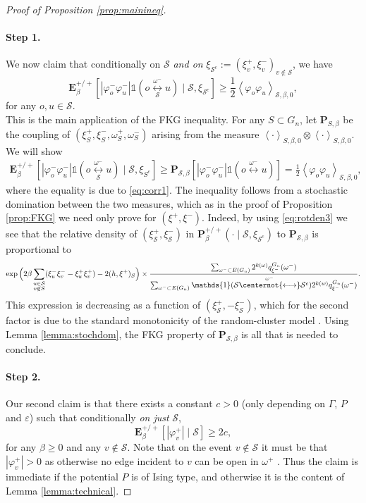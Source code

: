 \documentclass{article}
\numberwithin{equation}{section}
\theoremstyle{definition}
\theoremstyle{definition}
\theoremstyle{remark}
\newcommand{\E}{\mathbb{E}}
\newcommand\vp{\varphi}
\newcommand{\w}{\omega}
\newcommand{\vpm}{\vp^-}
\renewcommand{\P}{\mathrm{\mathbf{P}}}
\newcommand{\Q}{\mathrm{\mathbf{P}}}
\renewcommand{\E}{\mathrm{\mathbf{E}}}
\renewcommand{\L}{\xi}
\renewcommand{\i}{\mathds{1}}
\renewcommand{\S}{\mathcal{S}}
\newcommand{\eps}{\varepsilon}
\newcommand{\G}{\Gamma}
\begin{document}
\begin{proof}[Proof of Proposition \ref{prop:mainineq}]
	\paragraph{Step 1. }We now claim that conditionally on $\S$ \emph{and on} $\L_{\S^c} := ( \L^+_v, \L^-_v)_{v \not\in \S}$, we have
	\[
		\E_\beta^{+ / +}\left[|\vpm_o\vpm_u| \i(o \underset{\S}{\overset{\w^-}{\longleftrightarrow}} u) \mid \S, \L_{\S^c} \right] \geq \frac{1}{2}\left< \vp_o \vp_u \right>_{\S,\beta,0},
	\] 
	for any $o,u \in \S$.
	\\[1em]
	\noindent This is the main application of the FKG inequality. For any $S \subset G_n$, let $\Q_{S,\beta}$ be the coupling of $(\L^+_S,\L^-_S,\w^+_S,\w^-_S)$ arising from the measure $\left< \cdot \right>_{S,\beta,0} \otimes \left< \cdot \right>_{S,\beta,0}$. We will show 
	\begin{align}\label{eq:keystep}
		\E_{\beta}^{+ / +}\left[ |\vpm_o \vpm_u| \i(o \underset{\S}{\overset{\w^-}{\longleftrightarrow}} u)\mid \S , \L_{S^c}  \right] \geq \Q_{\S,\beta}\left[ |\vpm_o \vpm_u| \i(o \overset{\w^-}{\longleftrightarrow} u) \right]  = \frac{1}{2} \left< \vp_o \vp_u \right>_{\S,\beta,0},
	\end{align} 
	where the equality is due to \eqref{eq:corr1}. The inequality follows from a stochastic domination between the two measures, which as in the proof of Proposition \ref{prop:FKG} we need only prove for $(\L^+,\L^-)$. Indeed, by using \eqref{eq:rotden3} we see that the relative density of $(\L^+_\S,\L^-_\S)$ in $\P_\beta^{+ / +}(\cdot \mid \S,\L_{\S^c})$ to $\Q_{\S,\beta}$ is proportional to 
	\[
		\exp\Big( 2\beta \sum_{\substack{u \in \S \\ v \not\in S}} (\L^-_u \L^-_v - \L^+_u\L^+_v) - 2(h,\L^+)_S\Big) \times \frac{\sum_{\w^- \subset E(G_n)} 2^{k(\w)} q^{G_n}_{\L^-}(\w^-) }{\sum_{\w^- \subset E(G_n)} \i(\S \overset{\w^-}{\centernot{\longleftrightarrow}} \S^c) 2^{k(w)} q^{G_n}_{\L^-}(\w^-) }.
	\] 
	This expression is decreasing as a function of $(\L^+_\S,-\L^-_\S)$, which for the second factor is due to the standard monotonicity of the random-cluster model \cite{Grimmett}. Using Lemma \ref{lemma:stochdom}, the FKG property of $\Q_{\S,\beta}$ is all that is needed to conclude.  
	\paragraph{Step 2. } Our second claim is that there exists a constant $c > 0$ (only depending on $\G$, $P$ and $\eps$) such that conditionally \emph{on just} $\S$,
	\[
		\E^{+ / +}_\beta\left[ |\vp^+_v| \mid \S \right] \geq 2c,
	\] 
	for any $\beta \geq 0$ and any $v \not\in \S$. Note that on the event $v \not\in \S$ it must be that $|\vp^+_v| > 0$ as otherwise no edge incident to $v$ can be open in $\w^+$ . Thus the claim is immediate if the potential $P$ is of Ising type, and otherwise it is the content of Lemma \ref{lemma:technical}.

\end{proof}
\end{document}
